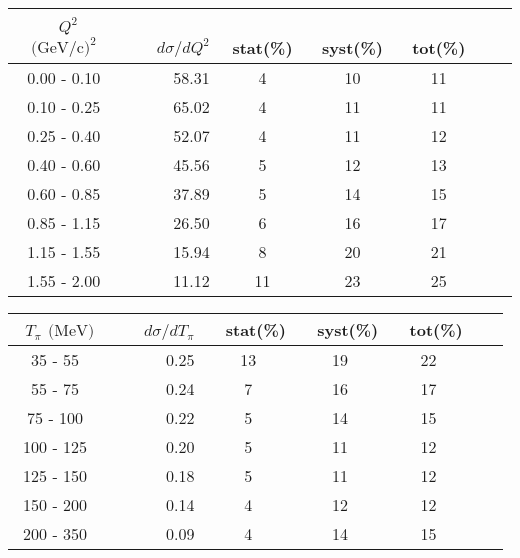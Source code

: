 \documentclass[aps, prd, reprint,showpacs,  preprintnumbers,amsmath,amssymb,superscriptaddress, nofootinbib]{revtex4-1}
\makeatletter
\renewenvironment{table}
  {\def\@captype{table}}
  {}
\makeatother
\begin{document}

\begin{table}
\centering
\begin{tabular}{crccccc}
\hline
~$Q^2$ $\text{(GeV/c)}^2$ &~~~ $d\sigma/dQ^2$ &~ stat(\%) &~ syst(\%) &~ tot(\%)  \\
\hline
 0.00 -  0.10 &  58.31 &    4 &   10 &   11 \\
 0.10 -  0.25 &  65.02 &    4 &   11 &   11 \\
 0.25 -  0.40 &  52.07 &    4 &   11 &   12 \\
 0.40 -  0.60 &  45.56 &    5 &   12 &   13 \\
 0.60 -  0.85 &  37.89 &    5 &   14 &   15 \\
 0.85 -  1.15 &  26.50 &    6 &   16 &   17 \\
 1.15 -  1.55 &  15.94 &    8 &   20 &   21 \\
 1.55 -  2.00 &  11.12 &   11 &   23 &   25 \\
\hline\hline
\end{tabular}
\caption{ Flux-averaged differential cross section in $Q^2$, 
$d\sigma/dQ^2 (10^{-40}\text{cm}^2/\text{nucleon}/(\text{GeV/c})^2)$, 
for N$\pi^+$ production with statistical (stat), systematic (syst), and total (tot) uncertainties.}
\label{tb:pipQ2}
\end{table}

\vskip 10pt

\begin{table}
\centering
\begin{tabular}{crccccc}
\hline
~$T_\pi$ $\text{(MeV)}$ &~~~ $d\sigma/dT_\pi$ &~ stat(\%) &~ syst(\%) &~ tot(\%)  \\
\hline
35 - 55 &   0.25 &   13 &   19 &   22 \\
55 - 75 &   0.24 &    7 &   16 &   17 \\
75 - 100 &   0.22 &    5 &   14 &   15 \\
100 - 125 &   0.20 &    5 &   11 &   12 \\
125 - 150 &   0.18 &    5 &   11 &   12 \\
150 - 200 &   0.14 &    4 &   12 &   12 \\
200 - 350 &   0.09 &    4 &   14 &   15 \\
\hline\hline
\end{tabular}
\caption{ Flux-averaged differential cross section in $T_\pi$, 
$d\sigma/dT_{\pi} (10^{-40}\text{cm}^2/\text{nucleon}/\text{MeV})$, 
for N$\pi^+$ production with statistical (stat), systematic (syst), and total (tot) uncertainties.}
\label{tb:pip_kinetic}
\end{table}
\end{document}
